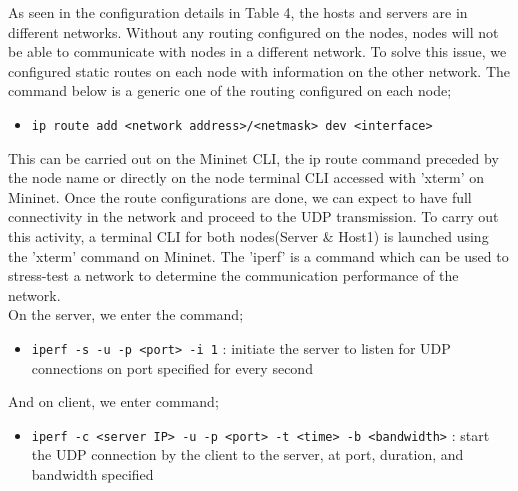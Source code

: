 \documentclass{article}
\begin{document}
\par As seen in the configuration details in Table 4, the hosts and servers are in different networks. Without any routing configured on the nodes, nodes will not be able to communicate with nodes in a different network. To solve this issue, we configured static routes on each node with information on the other network. The command below is a generic one of the routing configured on each node; 
	\begin{itemize}
		\centering
		\item \texttt{ip route add <network address>/<netmask>  dev <interface>}
	\end{itemize}
This can be carried out on the Mininet CLI, the ip route command preceded by the node name or directly on the node terminal CLI accessed with 'xterm' on Mininet. Once the route configurations are done, we can expect to have full connectivity in the network and proceed to the UDP transmission. To carry out this activity, a terminal CLI for both nodes(Server \& Host1) is launched using the 'xterm' command on Mininet. The 'iperf' is a command which can be used to stress-test a network to determine the communication performance of the network. \\ On the server, we enter the command; 
	\begin{itemize}
		\item \texttt{iperf -s -u -p <port> -i 1} : initiate the server to listen for UDP connections on port specified for every second
	\end{itemize}
And on client, we enter command;
	\begin{itemize}
		\item \texttt{iperf -c <server IP> -u -p <port> -t <time> -b <bandwidth>} : start the UDP connection by the client to the server, at port, duration, and bandwidth specified
	\end{itemize}
\end{document}
